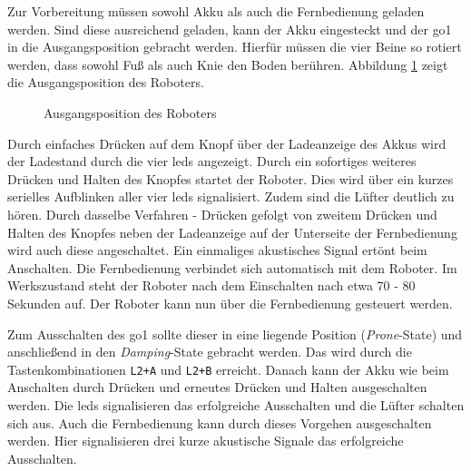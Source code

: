 \noindent Zur Vorbereitung müssen sowohl Akku als auch die Fernbedienung geladen werden.
Sind diese ausreichend geladen, kann der Akku eingesteckt und der \gls{go1} in die Ausgangsposition gebracht werden.
Hierfür müssen die vier Beine so rotiert werden, dass sowohl Fuß als auch Knie den Boden berühren.
Abbildung \ref{fig:ausgangsposition} zeigt die Ausgangsposition des Roboters.

\begin{figure}[h]
    \caption{Ausgangsposition des Roboters}\label{fig:ausgangsposition}
\end{figure}

Durch einfaches Drücken auf dem Knopf über der Ladeanzeige des Akkus wird der Ladestand durch die vier \glspl{led}
angezeigt.
Durch ein sofortiges weiteres Drücken und Halten des Knopfes startet der Roboter.
Dies wird über ein kurzes serielles Aufblinken aller vier \glspl{led} signalisiert.
Zudem sind die Lüfter deutlich zu hören.
Durch dasselbe Verfahren - Drücken gefolgt von zweitem Drücken und Halten des Knopfes neben der Ladeanzeige auf
der Unterseite der Fernbedienung wird auch diese angeschaltet.
Ein einmaliges akustisches Signal ertönt beim Anschalten.
Die Fernbedienung verbindet sich automatisch mit dem Roboter.
Im Werkszustand steht der Roboter nach dem Einschalten nach etwa \num{70} - \num{80} Sekunden auf.
Der Roboter kann nun über die Fernbedienung gesteuert werden.

Zum Ausschalten des \gls{go1} sollte dieser in eine liegende Position (\emph{Prone}-State) und anschließend in den \emph{Damping}-State gebracht werden.
Das wird durch die Tastenkombinationen \texttt{L2+A} und \texttt{L2+B} erreicht.
Danach kann der Akku wie beim Anschalten durch Drücken und erneutes Drücken und Halten ausgeschalten werden.
Die \glspl{led} signalisieren das erfolgreiche Ausschalten und die Lüfter schalten sich aus.
Auch die Fernbedienung kann durch dieses Vorgehen ausgeschalten werden.
Hier signalisieren drei kurze akustische Signale das erfolgreiche Ausschalten.

